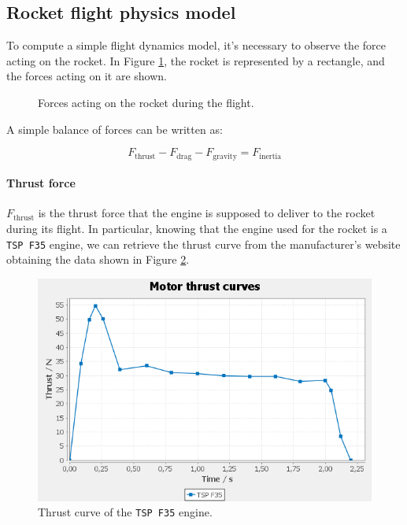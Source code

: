 \subsection{Rocket flight physics model}
\label{subsec:rocket_flight_model}

To compute a simple flight dynamics model, it's necessary to observe the force acting on the rocket.
In Figure \ref{fig:forces_on_rocket}, the rocket is represented by a rectangle, and the forces acting on it are shown.

\begin{figure}[H]

    \centering
    \caption{Forces acting on the rocket during the flight.}
    \label{fig:forces_on_rocket}

\end{figure}

A simple balance of forces can be written as:

\begin{equation}
    F_{\text{thrust}} - F_{\text{drag}} - F_{\text{gravity}} = F_{\text{inertia}}
\end{equation}


\paragraph{Thrust force}

$F_{\text{thrust}}$ is the thrust force that the engine is supposed to deliver to the rocket during its flight.
In particular, knowing that the engine used for the rocket is a \texttt{TSP F35} engine, we can retrieve the thrust curve from the manufacturer's website obtaining the data shown in Figure \ref{fig:thrust_curve}.

\begin{figure}[H]
    \centering
    \includegraphics[width=.6\textwidth]{img/Thrust_curve.png}
    \caption{Thrust curve of the \texttt{TSP F35} engine.}
    \label{fig:thrust_curve}
\end{figure}


